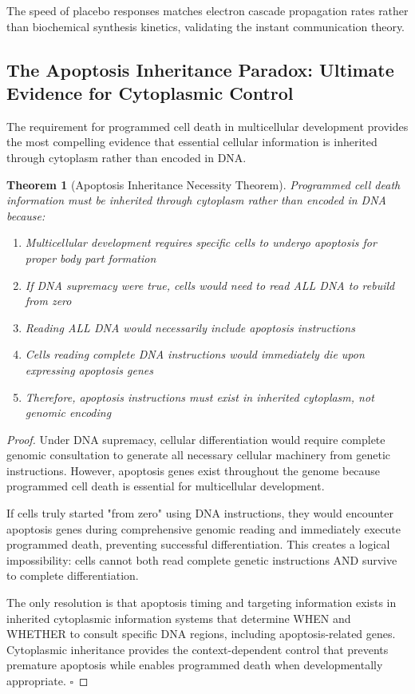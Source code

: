 \documentclass[12pt,a4paper]{article}
\newtheorem{theorem}{Theorem}[section]
\begin{document}
The speed of placebo responses matches electron cascade propagation rates rather than biochemical synthesis kinetics, validating the instant communication theory.

\subsection{The Apoptosis Inheritance Paradox: Ultimate Evidence for Cytoplasmic Control}

The requirement for programmed cell death in multicellular development provides the most compelling evidence that essential cellular information is inherited through cytoplasm rather than encoded in DNA.

\begin{theorem}[Apoptosis Inheritance Necessity Theorem]
Programmed cell death information must be inherited through cytoplasm rather than encoded in DNA because:
\begin{enumerate}
\item Multicellular development requires specific cells to undergo apoptosis for proper body part formation
\item If DNA supremacy were true, cells would need to read ALL DNA to rebuild from zero
\item Reading ALL DNA would necessarily include apoptosis instructions
\item Cells reading complete DNA instructions would immediately die upon expressing apoptosis genes
\item Therefore, apoptosis instructions must exist in inherited cytoplasm, not genomic encoding
\end{enumerate}
\end{theorem}

\begin{proof}
Under DNA supremacy, cellular differentiation would require complete genomic consultation to generate all necessary cellular machinery from genetic instructions. However, apoptosis genes exist throughout the genome because programmed cell death is essential for multicellular development.

If cells truly started "from zero" using DNA instructions, they would encounter apoptosis genes during comprehensive genomic reading and immediately execute programmed death, preventing successful differentiation. This creates a logical impossibility: cells cannot both read complete genetic instructions AND survive to complete differentiation.

The only resolution is that apoptosis timing and targeting information exists in inherited cytoplasmic information systems that determine WHEN and WHETHER to consult specific DNA regions, including apoptosis-related genes. Cytoplasmic inheritance provides the context-dependent control that prevents premature apoptosis while enables programmed death when developmentally appropriate. $\square$
\end{proof}
\end{document}
